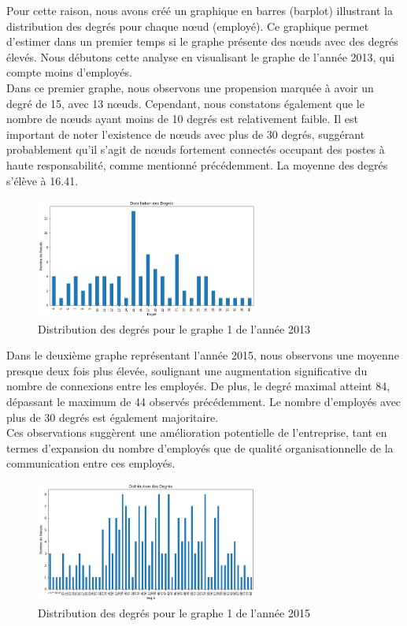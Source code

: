 \documentclass{article}
\begin{document}
Pour cette raison, nous avons créé un graphique en barres (barplot) illustrant la distribution des degrés pour chaque nœud (employé). Ce graphique permet d'estimer dans un premier temps si le graphe présente des nœuds avec des degrés élevés. Nous débutons cette analyse en visualisant le graphe de l'année 2013, qui compte moins d'employés. \\

Dans ce premier graphe, nous observons une propension marquée à avoir un degré de 15, avec 13 nœuds. Cependant, nous constatons également que le nombre de nœuds ayant moins de 10 degrés est relativement faible. Il est important de noter l'existence de nœuds avec plus de 30 degrés, suggérant probablement qu'il s'agit de nœuds fortement connectés occupant des postes à haute responsabilité, comme mentionné précédemment. La moyenne des degrés s'élève à 16.41.

\begin{figure}[!h]
    \centering
    \includegraphics[width=0.65\textwidth]{assets/communaute/distribution_deg_2013}
    \caption{Distribution des degrés pour le graphe 1 de l'année 2013}
    \label{fig:distribution_deg_2013}
\end{figure}

Dans le deuxième graphe représentant l'année 2015, nous observons une moyenne presque deux fois plus élevée, soulignant une augmentation significative du nombre de connexions entre les employés. De plus, le degré maximal atteint 84, dépassant le maximum de 44 observés précédemment. Le nombre d'employés avec plus de 30 degrés est également majoritaire. \\

Ces observations suggèrent une amélioration potentielle de l'entreprise, tant en termes d'expansion du nombre d'employés que de qualité organisationnelle de la communication entre ces employés.


\begin{figure}[!h]
    \centering
    \includegraphics[width=0.65\textwidth]{assets/communaute/distribution_deg_2015}
    \caption{Distribution des degrés pour le graphe 1 de l'année 2015}
    \label{fig:distribution_deg_2015}
\end{figure}
\end{document}
